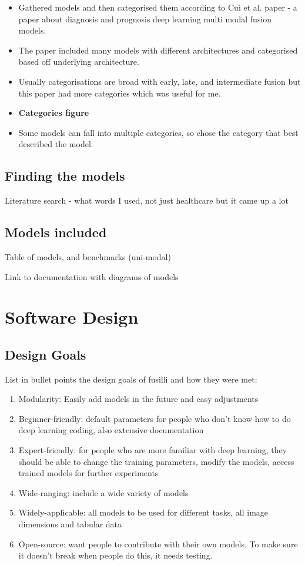 \begin{itemize}
    \item Gathered models and then categorised them according to Cui et al. paper - a paper about diagnosis and prognosis deep learning multi modal fusion models.
    \item The paper included many models with different architectures and categorised based off underlying architecture.
    \item Usually categorisations are broad with early, late, and intermediate fusion but this paper had more categories which was useful for me.
    \item \textbf{Categories figure}
    \item Some models can fall into multiple categories, so chose the category that best described the model.
\end{itemize}


\subsection{Finding the models}
Literature search - what words I used, not just healthcare but it came up a lot 

\subsection{Models included}

Table of models, and benchmarks (uni-modal)

Link to documentation with diagrams of models

\section{Software Design}

\subsection{Design Goals}
List in bullet points the design goals of fusilli and how they were met: 
\begin{enumerate}
    \item Modularity: Easily add models in the future and easy adjustments
    \item Beginner-friendly: default parameters for people who don't know how to do deep learning coding, also extensive documentation
    \item Expert-friendly: for people who are more familiar with deep learning, they should be able to change the training parameters, modify the models, access trained models for further experiments
    \item Wide-ranging: include a wide variety of models
    \item Widely-applicable: all models to be used for different tasks, all image dimensions and tabular data
    \item Open-source: want people to contribute with their own models. To make sure it doesn't break when people do this, it needs testing. 
\end{enumerate}


